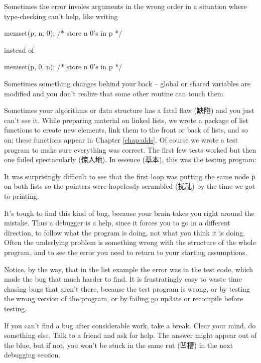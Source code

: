 Sometimes the error involes arguments in the wrong order in a situation
where type-checking can't help, like writing
\begin{badcode}
    memset(p, n, 0);    /* store n 0's in p */
\end{badcode}
instead of 
\begin{wellcode}
    memset(p, 0, n);    /* store n 0's in p */
\end{wellcode}

Sometimes something changes behind your back -- global or shared variables
are modified and you don't realize that some other routine can touch them.

Sometimes your algorithms or data structure has a fatal flaw (缺陷) and you
just can't see it. While preparing material on linked lists, we wrote a
package of list functions to create new elements, link them to the front or
back of lists, and so on; these functions appear in Chapter
\ref{chap:alds}. Of course we wrote a test program to make sure everything
was correct. The first few tests worked but then one failed spectacularly
(惊人地). In essence (基本), this was the testing program:
It was surprisingly difficult to see that the first loop was putting the
same node \verb'p' on both lists so the pointers were hopelessly scrambled
(扰乱) by the time we got to printing.

It's tough to find this kind of bug, because your brain takes you right
around the mistake. Thus a debugger is a help, since it forces you to go in
a different direction, to follow what the program is doing, not what you
think it is doing. Often the underlying problem is something wrong with the
structure of the whole program, and to see the error you need to return to
your starting assumptions.

Notice, by the way, that in the list example the error was in the test
code, which made the bug that much harder to find. It is frustratingly easy
to waste time chasing bugs that aren't there, because the test program is
wrong, or by testing the wrong version of the program, or by failing go
update or recompile before testing.

If you can't find a bug after considerable work, take a break. Clear your
mind, do something else. Talk to a friend and ask for help. The answer
might appear out of the blue, but if not, you won't be stuck in the same
rut (凹槽) in the next debugging session.

